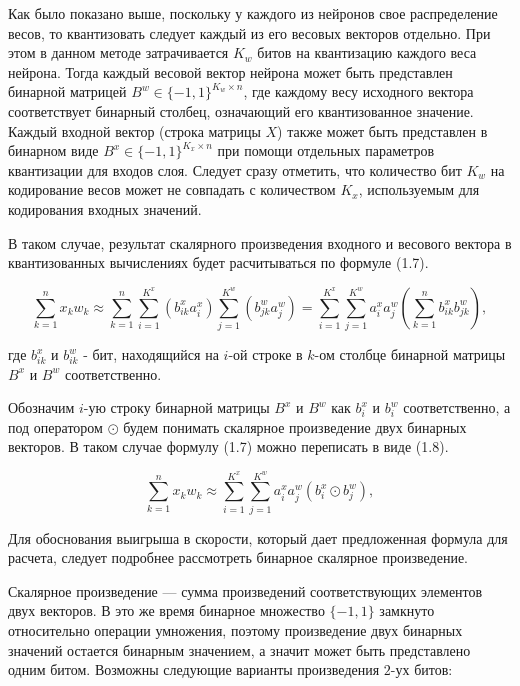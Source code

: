 Как было показано выше, поскольку у каждого из нейронов свое распределение весов, то квантизовать следует каждый из его весовых векторов отдельно. При этом в данном методе затрачивается $K_w$ битов на квантизацию каждого веса нейрона. Тогда каждый весовой вектор нейрона может быть представлен бинарной матрицей $B^w \in \{ -1, 1\}^{K_w \times n}$, где каждому весу исходного вектора соответствует бинарный столбец, означающий его квантизованное значение.  Каждый входной вектор (строка матрицы $X$) также может быть представлен в бинарном виде $B^x \in \{ -1, 1 \}^{K_x \times n}$  при помощи отдельных параметров квантизации для входов слоя. Следует сразу отметить, что количество бит $K_w$ на кодирование весов может не совпадать с количеством $K_x$, используемым для кодирования входных значений.

В таком случае, результат скалярного произведения входного и весового вектора в квантизованных вычислениях будет расчитываться по формуле (1.7).

\begin{equation}
\sum\limits_{k = 1}^{n} x_k w_k \approx \sum\limits_{k = 1}^{n}\sum\limits_{i = 1}^{K^x} (b^x_{ik} a^x_i) \sum\limits_{j = 1}^{K^w} (b^w_{jk} a^w_j) = \sum\limits_{i = 1}^{K^x}\sum\limits_{j = 1}^{K^w} a^x_i a^w_j (\sum\limits_{k = 1}^{n} b^x_{ik} b^w_{jk}),
\end{equation}

где $b^x_{ik}$ и $b^w_{ik}$ - бит, находящийся на $i$-ой строке в $k$-ом столбце бинарной матрицы $B^x$ и $B^w$ соответственно. 

Обозначим $i$-ую строку бинарной матрицы $B^x$ и $B^w$ как $b^x_{i}$ и $b^w_{i}$ соответственно, а под оператором $\odot$ будем понимать скалярное произведение двух бинарных векторов. В таком случае формулу (1.7) можно переписать в виде (1.8).

\begin{equation}
\sum\limits_{k = 1}^{n} x_k w_k \approx \sum\limits_{i = 1}^{K^x}\sum\limits_{j = 1}^{K^w} a^x_i a^w_j (b^x_{i} \odot b^w_{j}),
\end{equation}

Для обоснования выигрыша в скорости, который дает предложенная формула для расчета, следует подробнее рассмотреть бинарное скалярное произведение.

 Скалярное произведение — сумма произведений соответствующих элементов двух векторов. В это же время бинарное множество $\{ -1, 1 \}$ замкнуто относительно операции умножения, поэтому произведение двух бинарных значений остается бинарным значением, а значит может быть представлено одним битом. Возможны следующие варианты произведения $2$-ух битов:

